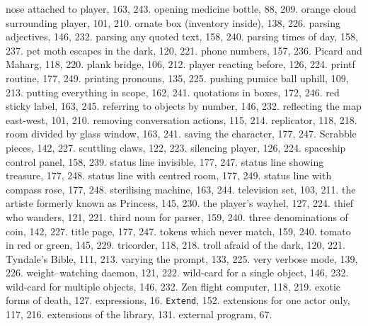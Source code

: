 \quad  nose attached to player, 163, 243.
\quad  opening medicine bottle, 88, 209.
\quad  orange cloud surrounding player, 101, 210.
\quad  ornate box (inventory inside), 138, 226.
\quad  parsing adjectives, 146, 232.
\quad  parsing any quoted text, 158, 240.
\quad  parsing times of day, 158, 237.
\quad  pet moth escapes in the dark, 120, 221.
\quad  phone numbers, 157, 236.
\quad  Picard and Maharg, 118, 220.
\quad  plank bridge, 106, 212.
\quad  player reacting before, 126, 224.
\quad  printf routine, 177, 249.
\quad  printing pronouns, 135, 225.
\quad  pushing pumice ball uphill, 109, 213.
\quad  putting everything in scope, 162, 241.
\quad  quotations in boxes, 172, 246.
\quad  red sticky label, 163, 245.
\quad  referring to objects by number, 146, 232.
\quad  reflecting the map east-west, 101, 210.
\quad  removing conversation actions, 115, 214.
\quad  replicator, 118, 218.
\quad  room divided by glass window, 163, 241.
\quad  saving the character, 177, 247.
\quad  Scrabble pieces, 142, 227.
\quad  scuttling claws, 122, 223.
\quad  silencing player, 126, 224.
\quad  spaceship control panel, 158, 239.
\quad  status line invisible, 177, 247.
\quad  status line showing treasure, 177, 248.
\quad  status line with centred room, 177, 249.
\quad  status line with compass rose, 177, 248.
\quad  sterilising machine, 163, 244.
\quad  television set, 103, 211.
\quad  the artiste formerly known as Princess, 145, 230.
\quad  the player's wayhel, 127, 224.
\quad  thief who wanders, 121, 221.
\quad  third noun for parser, 159, 240.
\quad  three denominations of coin, 142, 227.
\quad  title page, 177, 247.
\quad  tokens which never match, 159, 240.
\quad  tomato in red or green, 145, 229.
\quad  tricorder, 118, 218.
\quad  troll afraid of the dark, 120, 221.
\quad  Tyndale's Bible, 111, 213.
\quad  varying the prompt, 133, 225.
\quad  very verbose mode, 139, 226.
\quad  weight--watching daemon, 121, 222.
\quad  wild-card for a single object, 146, 232.
\quad  wild-card for multiple objects, 146, 232.
\quad  Zen flight computer, 118, 219.
exotic forms of death, 127.
expressions, 16.
{{\tt Extend}}, 152.
extensions for one actor only, 117, 216.
extensions of the library, 131.
external program, 67.

